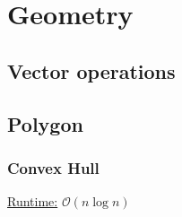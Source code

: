 \section{Geometry}
\subsection{Vector operations}

\subsection{Polygon}
\subsubsection{Convex Hull}
\underline{Runtime:} $\mathcal{O}(n \log n)$

